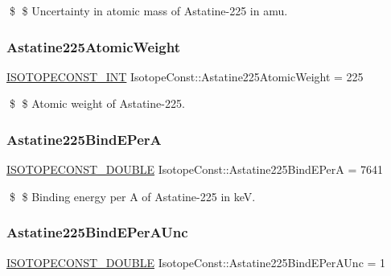 \$ \$ Uncertainty in atomic mass of Astatine-\/225 in amu. \mbox{\label{group___isotope_const-_astatine-_at225_ga97534ac858da112b8a551ad422049b04}} 
\subsubsection{\texorpdfstring{Astatine225\+Atomic\+Weight}{Astatine225AtomicWeight}}
{\footnotesize\ttfamily \mbox{\hyperlink{group___isotope_const-_macros_ga5f18360b3e99483a35c32d789e62621c}{I\+S\+O\+T\+O\+P\+E\+C\+O\+N\+S\+T\+\_\+\+I\+NT}} Isotope\+Const\+::\+Astatine225\+Atomic\+Weight = 225}

\$ \$ Atomic weight of Astatine-\/225. \mbox{\label{group___isotope_const-_astatine-_at225_ga3806af05a865cbeac3f11f0642c22ea4}} 
\subsubsection{\texorpdfstring{Astatine225\+Bind\+E\+PerA}{Astatine225BindEPerA}}
{\footnotesize\ttfamily \mbox{\hyperlink{group___isotope_const-_macros_ga8f45a7272ce02c0b4c65c44636ed719a}{I\+S\+O\+T\+O\+P\+E\+C\+O\+N\+S\+T\+\_\+\+D\+O\+U\+B\+LE}} Isotope\+Const\+::\+Astatine225\+Bind\+E\+PerA = 7641}

\$ \$ Binding energy per A of Astatine-\/225 in keV. \mbox{\label{group___isotope_const-_astatine-_at225_gad868aa71c15d85c7148d4e54c28feb9c}} 
\subsubsection{\texorpdfstring{Astatine225\+Bind\+E\+Per\+A\+Unc}{Astatine225BindEPerAUnc}}
{\footnotesize\ttfamily \mbox{\hyperlink{group___isotope_const-_macros_ga8f45a7272ce02c0b4c65c44636ed719a}{I\+S\+O\+T\+O\+P\+E\+C\+O\+N\+S\+T\+\_\+\+D\+O\+U\+B\+LE}} Isotope\+Const\+::\+Astatine225\+Bind\+E\+Per\+A\+Unc = 1}

